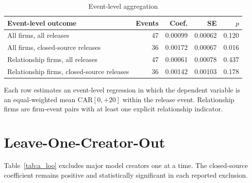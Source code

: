 \documentclass[12pt]{article}
\begin{document}
\begin{table}[htbp]
\centering
\caption{Event-level aggregation}
\label{tab:a_eventlevel}
\begin{threeparttable}
\begin{tabular}{lrrrr}
\toprule
Event-level outcome & Events & Coef. & SE & $p$ \\
\midrule
All firms, all releases & 47 & 0.00099 & 0.00062 & 0.120 \\
All firms, closed-source releases & 36 & 0.00172 & 0.00067 & 0.016 \\
Relationship firms, all releases & 47 & 0.00061 & 0.00078 & 0.437 \\
Relationship firms, closed-source releases & 36 & 0.00142 & 0.00103 & 0.178 \\
\bottomrule
\end{tabular}
\begin{tablenotes}[flushleft]\footnotesize
\item Each row estimates an event-level regression in which the dependent
variable is an equal-weighted mean CAR$[0,{+}20]$ within the release event.
Relationship firms are firm-event pairs with at least one explicit relationship
indicator.
\end{tablenotes}
\end{threeparttable}
\end{table}

\section{Leave-One-Creator-Out}
\label{app:loo}

Table~\ref{tab:a_loo} excludes major model creators one at a time. The
closed-source coefficient remains positive and statistically significant in each
reported exclusion.
\end{document}

